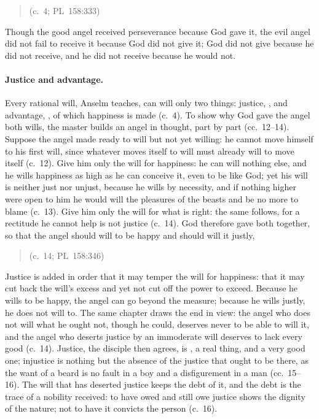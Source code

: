 \begin{quote}
 (c.~4; PL~158:333)
\end{quote}

\noindent Though the good angel received perseverance because God gave it,
the evil angel did not fail to receive it because God did not give it; God
did not give because he did not receive, and he did not receive because he
would not.

\paragraph{Justice and advantage.} Every rational will, Anselm teaches, can
will only two things: justice, , and advantage,
, of which happiness is made (c.~4). To show why God gave
the angel both wills, the master builds an angel in thought, part by part
(cc.~12--14). Suppose the angel made ready to will but not yet willing: he
cannot move himself to his first will, since whatever moves itself to will
must already will to move itself (c.~12). Give him only the will for
happiness: he can will nothing else, and he wills happiness as high as he
can conceive it, even to be like God; yet his will is neither just nor
unjust, because he wills by necessity, and if nothing higher were open to
him he would will the pleasures of the beasts and be no more to blame
(c.~13). Give him only the will for what is right: the same follows, for a
rectitude he cannot help is not justice (c.~14). God therefore gave both
together, so that the angel should will to be happy and should will it
justly,

\begin{quote}
(c.~14; PL~158:346)
\end{quote}

\noindent Justice is added in order that it may temper the will for
happiness: that it may cut back the will's excess and yet not cut off the
power to exceed. Because he wills to be happy, the angel can go beyond the
measure; because he wills justly, he does not will to. The same chapter
draws the end in view: the angel who does not will what he ought not, though
he could, deserves never to be able to will it, and the angel who deserts
justice by an immoderate will deserves to lack every good (c.~14). Justice,
the disciple then agrees, is , a real thing, and a very good one; injustice is
nothing but the absence of the justice that ought to be there, as the want
of a beard is no fault in a boy and a disfigurement in a man (cc.~15--16).
The will that has deserted justice keeps the debt of it, and the debt is
the trace of a nobility received: to have owed and still owe justice shows
the dignity of the nature; not to have it convicts the person (c.~16).


